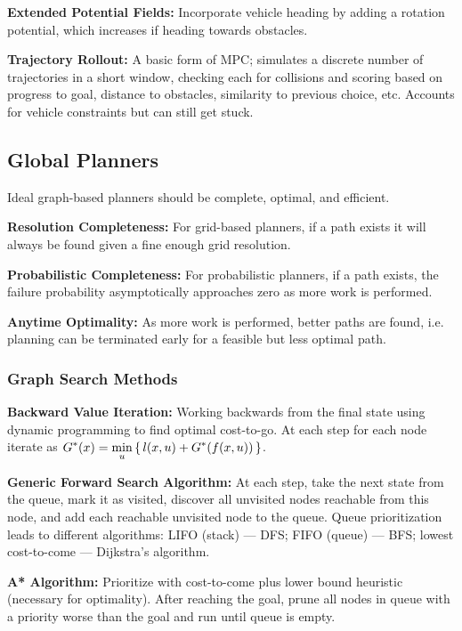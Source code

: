 \documentclass[twocolumn, 8pt]{extarticle}
\begin{document}
\textbf{Extended Potential Fields:} Incorporate vehicle heading by adding a rotation potential, which increases if
heading towards obstacles.

\textbf{Trajectory Rollout:} A basic form of MPC; simulates a discrete number of trajectories in a short window,
checking each for collisions and scoring based on progress to goal, distance to obstacles, similarity to previous choice,
etc. Accounts for vehicle constraints but can still get stuck.

\subsection{Global Planners}

Ideal graph-based planners should be complete, optimal, and efficient.

\textbf{Resolution Completeness:} For grid-based planners, if a path exists it will always be found given a fine enough
grid resolution.

\textbf{Probabilistic Completeness:} For probabilistic planners, if a path exists, the failure probability asymptotically approaches zero as more work is performed.

\textbf{Anytime Optimality:} As more work is performed, better paths are found, i.e. planning can be terminated early for a feasible but less optimal path.

\subsubsection{Graph Search Methods}

\textbf{Backward Value Iteration:} Working backwards from the final state using dynamic programming to find optimal
cost-to-go. At each step for each node iterate as \(\displaystyle G^*(x) = \min _u \set{l(x, u) + G^*(f(x, u))}\).

\textbf{Generic Forward Search Algorithm:} At each step, take the next state from the queue, mark it as visited,
discover all unvisited nodes reachable from this node, and add each reachable unvisited node to the queue. Queue
prioritization leads to different algorithms: LIFO (stack) --- DFS; FIFO (queue) --- BFS; lowest cost-to-come ---
Dijkstra's algorithm.

\textbf{A* Algorithm:} Prioritize with cost-to-come plus lower bound heuristic (necessary for optimality). After
reaching the goal, prune all nodes in queue with a priority worse than the goal and run until queue is empty.
\end{document}
